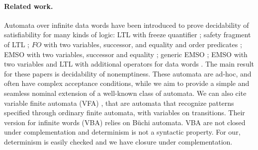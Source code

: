 \paragraph{Related work.}	
Automata over infinite data words have been introduced to prove decidability of satisfiability for many kinds of logic: LTL with freeze quantifier \cite{DemriL09}; safety fragment of LTL \cite{Lazic11}; $FO$ with two variables, successor, and equality and order predicates \cite{BojanczykDMSS11}; EMSO with two variables, successor and equality \cite{KaraST12}; generic EMSO \cite{Bollig11}; EMSO with two variables and LTL with additional operators for data words \cite{KaraT10}. The main result for these papers is decidability of nonemptiness. These automata are ad-hoc, and often have complex acceptance conditions, while we aim to provide a simple and seamless nominal extension of a well-known class of automata. We can also cite variable finite automata (VFA) \cite{GrumbergKS10}, that are automata that recognize patterns specified through ordinary finite automata, with variables on transitions. Their version for infinite words (VBA) relies on B\"uchi automata. VBA are not closed under complementation and determinism is not a syntactic property.
For our, determinism is easily checked and we have closure under complementation.
% 
% 	
